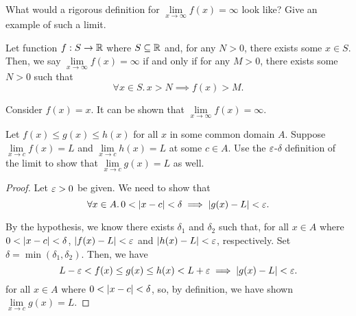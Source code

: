 \begin{problem}
  What would a rigorous definition for 
  $\lim\limits_{x \to \infty} f(x) = \infty$ look like? 
  Give an example of such a limit.

  \begin{definition}
    \label{def:limit-to-infty-x-to-infinite}
    Let function $f : S \to \mathbb{R}$ where $S \subseteq \mathbb{R}$ and, for any $N > 0$, there 
    exists some $x \in S$.
    Then, we say $\lim\limits_{x \to \infty} f(x) = \infty$ if and only if for any
    $M > 0$, there exists some $N > 0$ such that
    \[
      \forall x \in S.\, x > N \implies f(x) > M.
    \]
  \end{definition}

  Consider $f(x) = x$. It can be shown that $\lim\limits_{x \to \infty} f(x) = \infty$.

\end{problem}

\begin{problem}
  \label{prob:squeeze-theorem}
  Let $f(x) \leq g(x) \leq h(x)$ for all $x$ in some common domain $A$. Suppose $\lim\limits_{x \to c} f(x) = L$ and
  $\lim\limits_{x \to c} h(x) = L$ at some $c \in A$. Use the $\varepsilon$-$\delta$  definition of the limit
  to show  that $\lim\limits_{x \to c} g(x) = L$ as well.

  \begin{proof}
    Let $\varepsilon > 0$ be given. We need to show that
    \[
      \forall x \in A.\, 0 < \left\lvert x - c \right\rvert < \delta \implies \left\lvert g(x) - L \right\rvert < \varepsilon.
    \]

    By the hypothesis, we know there exists
    $\delta_{1}$ and $\delta_{2}$ such that, for all $x \in A$ where $0 < \left\lvert x - c \right\rvert < \delta$,
    $\left\lvert f(x) - L \right\rvert < \varepsilon$ and $\left\lvert h(x) - L \right\rvert < \varepsilon$, respectively. Set $\delta = \min{(\delta_{1}, \delta_{2})}$. 
    Then, we have
    \[
      L - \varepsilon < f(x) \leq g(x) \leq h(x) < L + \varepsilon \implies \left\lvert g(x) - L \right\rvert < \varepsilon.
    \]
    for all $x \in A$ where $0 < \left\lvert x - c \right\rvert < \delta$, so, by definition, we have 
    shown $\lim\limits_{x \to c} g(x) = L$.
    
  \end{proof}
  
\end{problem}
